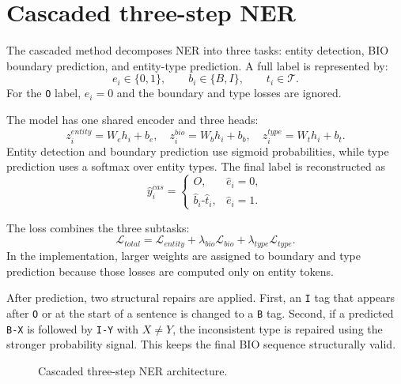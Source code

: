 \documentclass[12pt,a4paper]{report}
\begin{document}
\section{Cascaded three-step NER}
The cascaded method decomposes NER into three tasks: entity detection, BIO boundary prediction, and entity-type prediction. A full label is represented by:
\[
e_i\in\{0,1\},\qquad b_i\in\{B,I\},\qquad t_i\in\mathcal{T}.
\]
For the \texttt{O} label, $e_i=0$ and the boundary and type losses are ignored.

The model has one shared encoder and three heads:
\[
z_i^{entity}=W_eh_i+b_e,
\quad
z_i^{bio}=W_bh_i+b_b,
\quad
z_i^{type}=W_th_i+b_t.
\]
Entity detection and boundary prediction use sigmoid probabilities, while type prediction uses a softmax over entity types. The final label is reconstructed as
\[
\hat{y}_i^{cas}=\begin{cases}
O, & \hat{e}_i=0,\\
\hat{b}_i\text{-}\hat{t}_i, & \hat{e}_i=1.
\end{cases}
\]

The loss combines the three subtasks:
\[
\mathcal{L}_{total}=\mathcal{L}_{entity}+\lambda_{bio}\mathcal{L}_{bio}+\lambda_{type}\mathcal{L}_{type}.
\]
In the implementation, larger weights are assigned to boundary and type prediction because those losses are computed only on entity tokens.

After prediction, two structural repairs are applied. First, an \texttt{I} tag that appears after \texttt{O} or at the start of a sentence is changed to a \texttt{B} tag. Second, if a predicted \texttt{B-X} is followed by \texttt{I-Y} with $X\neq Y$, the inconsistent type is repaired using the stronger probability signal. This keeps the final BIO sequence structurally valid.

\begin{figure}[htbp]
\centering
{}
\caption{Cascaded three-step NER architecture.}
\label{fig:cascade}
\end{figure}
\end{document}
